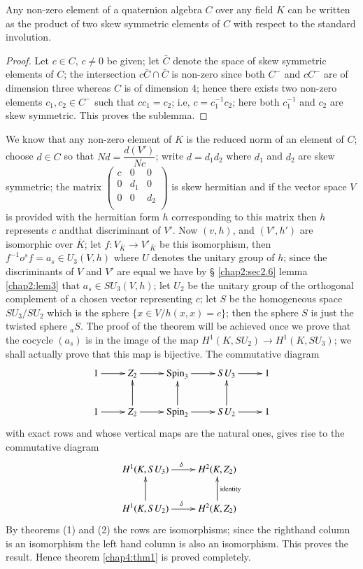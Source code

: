 \medskip
Any non-zero element of a quaternion algebra $C$ over any field $K$ 
can be written as the product of two skew symmetric elements of $C$
with respect to the standard involution. 
 
 \begin{proof} 
Let $c \in C$, $c \neq 0$ be given; let $\bar{C}$ denote the space of
skew symmetric elements of $C$; the intersection $c \bar{C} \cap
\bar{C}$ is non-zero since both $C^-$ and $c C^-$ are of
dimension three whereas $C$ is of dimension 4; hence there exists two
non-zero elements $c_1,c_2 \in C^-$ such that $cc_1=c_2$; i.e,
$c=c^{-1}_1 c_2$; here both $c^{-1}_1$ and $c_2$ are skew
symmetric. This proves the sublemma. 
 \end{proof} 
 
 We know that any non-zero element of $K$ is the reduced norm of an
 element of $C$; choose $d \in C$ so that $Nd = \dfrac{d(V')}{Nc}$;
 write $d=d_1d_2$ where $d_1$ and $d_2$ are skew symmetric; the matrix  
$
 \begin{pmatrix}
c & 0 & 0\\
0 & d_1 & 0 \\
0 & 0 & d_2\\
 \end{pmatrix} 
 $
 is skew hermitian and if the vector space $V$ is provided with the
 hermitian form $h$ corresponding to this matrix then $h$ represents
 $c$ and\pageoriginale that discriminant of $V'$. 
  Now $(v,h)$, and $(V',h')$ are isomorphic over $\bar{K}$; let
 $f:V_{\bar{K}} \to V'_{\bar{K}}$ be this isomorphism, then $f^{-1}o
 {}^sf=a_s \in U_3(V,h)$ where $U$ denotes the unitary group of $h$;
 since the discriminants of $V$ and $V'$ are equal we have by \S
 \ref{chap2:sec2.6}  lemma \ref{chap2:lem3} that $a_s \in
 SU_3(V,h)$; let $U_2$ be the unitary group of 
 the orthogonal complement of a chosen vector representing $c$; let
 $S$ be the homogeneous space $SU_3 /SU_2$ which is the sphere
 $\bigg\{x \in V/h(x,x)=c \bigg\}$; then the sphere $S$ is just the
 twisted sphere ${}_aS$. The proof of the theorem will be achieved once
 we prove that the cocycle $(a_s)$ is in the image of the map
 $H^1(K,SU_2) \to H^1(K,SU_3)$; we shall actually prove that this map
 is bijective. The commutative diagram 
\[
\xymatrix{
1 \ar[r] & Z_2 \ar[r] & \Spin_3 \ar[r] & SU_3 \ar[r] & 1\\
1 \ar[r] & Z_2 \ar[r] \ar[u] & \Spin_2 \ar[r] \ar[u] & SU_2 \ar[r]
\ar[u] & 1
}
\]
 with exact rows and whose vertical maps are the natural ones, gives
 rise to the commutative diagram 
\[
\xymatrix{
H^1 (K,SU_3) \ar[r]^{\delta} & H^2 (K,Z_2) \\
H^1 (K,SU_2) \ar[r]^{\delta} \ar[u] & H^2 (K,Z_2) \ar[u]_{\rm
  identity}
}
\] 
 By theorems (1) and (2) the rows are isomorphisms; since the
 righthand column is an isomorphism the left hand column is also an
 isomorphism. This proves the result. Hence theorem \ref{chap4:thm1} is proved
 completely. 
